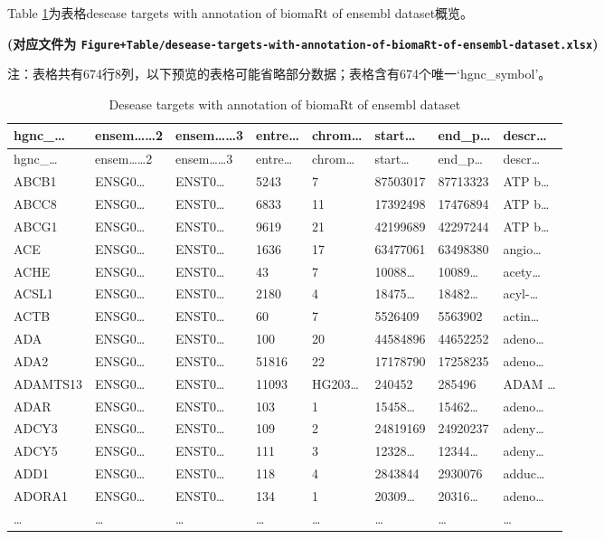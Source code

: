 \documentclass[
]{article}
\begin{document}
Table \ref{tab:desease-targets-with-annotation-of-biomaRt-of-ensembl-dataset}为表格desease targets with annotation of biomaRt of ensembl dataset概览。

\textbf{(对应文件为 \texttt{Figure+Table/desease-targets-with-annotation-of-biomaRt-of-ensembl-dataset.xlsx})}

\begin{center}\begin{tcolorbox}[colback=gray!10, colframe=gray!50, width=0.9\linewidth, arc=1mm, boxrule=0.5pt]注：表格共有674行8列，以下预览的表格可能省略部分数据；表格含有674个唯一`hgnc\_symbol'。
\end{tcolorbox}
\end{center}

\begin{longtable}[]{@{}llllllll@{}}
\caption{\label{tab:desease-targets-with-annotation-of-biomaRt-of-ensembl-dataset}Desease targets with annotation of biomaRt of ensembl dataset}\tabularnewline
\toprule
hgnc\_\ldots{} & ensem\ldots\ldots2 & ensem\ldots\ldots3 & entre\ldots{} & chrom\ldots{} & start\ldots{} & end\_p\ldots{} & descr\ldots{}\tabularnewline
\midrule
\endfirsthead
\toprule
hgnc\_\ldots{} & ensem\ldots\ldots2 & ensem\ldots\ldots3 & entre\ldots{} & chrom\ldots{} & start\ldots{} & end\_p\ldots{} & descr\ldots{}\tabularnewline
\midrule
\endhead
ABCB1 & ENSG0\ldots{} & ENST0\ldots{} & 5243 & 7 & 87503017 & 87713323 & ATP b\ldots{}\tabularnewline
ABCC8 & ENSG0\ldots{} & ENST0\ldots{} & 6833 & 11 & 17392498 & 17476894 & ATP b\ldots{}\tabularnewline
ABCG1 & ENSG0\ldots{} & ENST0\ldots{} & 9619 & 21 & 42199689 & 42297244 & ATP b\ldots{}\tabularnewline
ACE & ENSG0\ldots{} & ENST0\ldots{} & 1636 & 17 & 63477061 & 63498380 & angio\ldots{}\tabularnewline
ACHE & ENSG0\ldots{} & ENST0\ldots{} & 43 & 7 & 10088\ldots{} & 10089\ldots{} & acety\ldots{}\tabularnewline
ACSL1 & ENSG0\ldots{} & ENST0\ldots{} & 2180 & 4 & 18475\ldots{} & 18482\ldots{} & acyl-\ldots{}\tabularnewline
ACTB & ENSG0\ldots{} & ENST0\ldots{} & 60 & 7 & 5526409 & 5563902 & actin\ldots{}\tabularnewline
ADA & ENSG0\ldots{} & ENST0\ldots{} & 100 & 20 & 44584896 & 44652252 & adeno\ldots{}\tabularnewline
ADA2 & ENSG0\ldots{} & ENST0\ldots{} & 51816 & 22 & 17178790 & 17258235 & adeno\ldots{}\tabularnewline
ADAMTS13 & ENSG0\ldots{} & ENST0\ldots{} & 11093 & HG203\ldots{} & 240452 & 285496 & ADAM \ldots{}\tabularnewline
ADAR & ENSG0\ldots{} & ENST0\ldots{} & 103 & 1 & 15458\ldots{} & 15462\ldots{} & adeno\ldots{}\tabularnewline
ADCY3 & ENSG0\ldots{} & ENST0\ldots{} & 109 & 2 & 24819169 & 24920237 & adeny\ldots{}\tabularnewline
ADCY5 & ENSG0\ldots{} & ENST0\ldots{} & 111 & 3 & 12328\ldots{} & 12344\ldots{} & adeny\ldots{}\tabularnewline
ADD1 & ENSG0\ldots{} & ENST0\ldots{} & 118 & 4 & 2843844 & 2930076 & adduc\ldots{}\tabularnewline
ADORA1 & ENSG0\ldots{} & ENST0\ldots{} & 134 & 1 & 20309\ldots{} & 20316\ldots{} & adeno\ldots{}\tabularnewline
\ldots{} & \ldots{} & \ldots{} & \ldots{} & \ldots{} & \ldots{} & \ldots{} & \ldots{}\tabularnewline
\bottomrule
\end{longtable}
\end{document}
